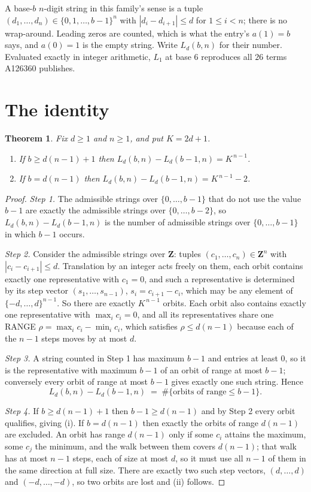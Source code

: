 \documentclass[11pt,a4paper]{article}
\theoremstyle{plain}
\newtheorem{theorem}{Theorem}
\theoremstyle{definition}
\begin{document}
A base-$b$ $n$-digit string in this family's sense is a tuple
$(d_1,\dots,d_n)\in\{0,1,\dots,b-1\}^{n}$ with $|d_i-d_{i+1}|\le d$ for $1\le i<n$; there
is no wrap-around. Leading zeros are counted, which is what the entry's $a(1)=b$ says, and
$a(0)=1$ is the empty string. Write $L_d(b,n)$ for their number. Evaluated exactly in integer
arithmetic, $L_{1}$ at base $6$ reproduces all $26$ terms A126360 publishes.

\section{The identity}

\begin{theorem}
Fix $d\ge1$ and $n\ge1$, and put $K=2d+1$.
\begin{enumerate}
\item[(i)] If $b\ge d(n-1)+1$ then $L_d(b,n)-L_d(b-1,n)=K^{\,n-1}$.
\item[(ii)] If $b=d(n-1)$ then $L_d(b,n)-L_d(b-1,n)=K^{\,n-1}-2$.
\end{enumerate}
\end{theorem}

\begin{proof}
\emph{Step 1.} The admissible strings over $\{0,\dots,b-1\}$ that do not use the value $b-1$
are exactly the admissible strings over $\{0,\dots,b-2\}$, so $L_d(b,n)-L_d(b-1,n)$ is the
number of admissible strings over $\{0,\dots,b-1\}$ in which $b-1$ occurs.

\emph{Step 2.} Consider the admissible strings over $\mathbf{Z}$: tuples
$(c_1,\dots,c_n)\in\mathbf{Z}^{n}$ with $|c_i-c_{i+1}|\le d$. Translation by an integer acts
freely on them, each orbit contains exactly one representative with $c_1=0$, and such a
representative is determined by its step vector $(s_1,\dots,s_{n-1})$, $s_i=c_{i+1}-c_i$,
which may be any element of $\{-d,\dots,d\}^{n-1}$. So there are exactly $K^{\,n-1}$ orbits.
Each orbit also contains exactly one representative with $\max_i c_i=0$, and all its
representatives share one RANGE $\rho=\max_ic_i-\min_ic_i$, which satisfies
$\rho\le d(n-1)$ because each of the $n-1$ steps moves by at most $d$.

\emph{Step 3.} A string counted in Step 1 has maximum $b-1$ and entries at least $0$, so it is
the representative with maximum $b-1$ of an orbit of range at most $b-1$; conversely every orbit
of range at most $b-1$ gives exactly one such string. Hence
\[
L_d(b,n)-L_d(b-1,n)\;=\;\#\{\text{orbits of range}\le b-1\} .
\]

\emph{Step 4.} If $b\ge d(n-1)+1$ then $b-1\ge d(n-1)$ and by Step 2 every orbit qualifies,
giving (i). If $b=d(n-1)$ then exactly the orbits of range $d(n-1)$ are excluded. An orbit has
range $d(n-1)$ only if some $c_i$ attains the maximum, some $c_j$ the minimum, and the walk
between them covers $d(n-1)$; that walk has at most $n-1$ steps, each of size at most $d$, so it
must use all $n-1$ of them in the same direction at full size. There are exactly two such step
vectors, $(d,\dots,d)$ and $(-d,\dots,-d)$, so two orbits are lost and (ii) follows.
\end{proof}
\end{document}
